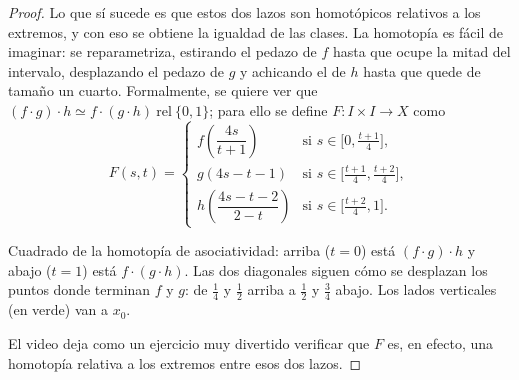\documentclass[11pt]{article}
\begin{document}
\begin{proof}
Lo que sí sucede es que estos dos lazos son homotópicos relativos a los extremos, y con eso se obtiene la igualdad de las clases. La homotopía es fácil de imaginar: se reparametriza, estirando el pedazo de $f$ hasta que ocupe la mitad del intervalo, desplazando el pedazo de $g$ y achicando el de $h$ hasta que quede de tamaño un cuarto. Formalmente, se quiere ver que $(f\cdot g)\cdot h\simeq f\cdot(g\cdot h)\ \mathrm{rel}\ \{0,1\}$; para ello se define $F\colon I\times I\to X$ como
\[
  F(s,t)=
  \begin{cases}
    f\!\left(\dfrac{4s}{t+1}\right) & \text{si } s\in\bigl[0,\tfrac{t+1}{4}\bigr],\\[8pt]
    g(4s-t-1) & \text{si } s\in\bigl[\tfrac{t+1}{4},\tfrac{t+2}{4}\bigr],\\[8pt]
    h\!\left(\dfrac{4s-t-2}{2-t}\right) & \text{si } s\in\bigl[\tfrac{t+2}{4},1\bigr].
  \end{cases}
\]
\begin{center}
\par\smallskip
\begin{minipage}{0.9\textwidth}\small\centering
Cuadrado de la homotopía de asociatividad: arriba ($t=0$) está $(f\cdot g)\cdot h$ y abajo ($t=1$) está $f\cdot(g\cdot h)$. Las dos diagonales siguen cómo se desplazan los puntos donde terminan $f$ y $g$: de $\tfrac14$ y $\tfrac12$ arriba a $\tfrac12$ y $\tfrac34$ abajo. Los lados verticales (en verde) van a $x_0$.
\end{minipage}
\end{center}

El video deja como un ejercicio muy divertido verificar que $F$ es, en efecto, una homotopía relativa a los extremos entre esos dos lazos.


\end{proof}
\end{document}
